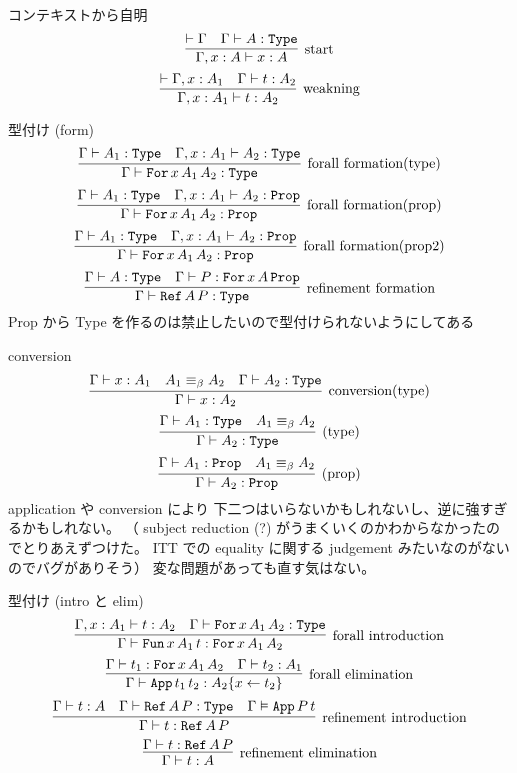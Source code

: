 \begin{itembox}[l]{コンテキストから自明}
  \[\infer[\text{start}]{\Gamma , x : A \vdash x : A}{\vdash \Gamma & \Gamma \vdash A : \texttt{Type}} \]
  \[\infer[\text{weakning}]{\Gamma , x : A_1 \vdash t : A_2}{\vdash \Gamma , x : A_1 & \Gamma \vdash t : A_2} \]
\end{itembox}

\begin{itembox}[l]{型付け (form) }
  \[\infer[\text{forall formation(type)}]{\Gamma \vdash \texttt{For} \, x \, A_1 \, A_2 : \texttt{Type}}{\Gamma \vdash A_1 : \texttt{Type} & \Gamma , x : A_1 \vdash A_2 : \texttt{Type} } \]
  \[\infer[\text{forall formation(prop)}]{\Gamma \vdash \texttt{For} \, x \, A_1 \, A_2 : \texttt{Prop}}{\Gamma \vdash A_1 : \texttt{Type} & \Gamma , x : A_1 \vdash A_2 : \texttt{Prop} } \]
  \[\infer[\text{forall formation(prop2)}]{\Gamma \vdash \texttt{For} \, x \, A_1 \, A_2 : \texttt{Prop}}{\Gamma \vdash A_1 : \texttt{Type} & \Gamma , x : A_1 \vdash A_2 : \texttt{Prop} }\]
  \[\infer[\text{refinement formation}]{\Gamma \vdash \texttt{Ref} \, A \, P : \texttt{Type}}{\Gamma \vdash A : \texttt{Type} & \Gamma \vdash P : \texttt{For} \, x \, A \, \texttt{Prop}} \]
  Prop から Type を作るのは禁止したいので型付けられないようにしてある
\end{itembox}

\begin{itembox}[l]{conversion}
  \[\infer[\text{conversion(type)}]{\Gamma \vdash x : A_2}{\Gamma \vdash x : A_1 & A_1 \equiv_{\beta} A_2 & \Gamma \vdash A_2 : \texttt{Type}} \]
  \[\infer[\text{(type)}]{\Gamma \vdash A_2 : \texttt{Type}}{\Gamma \vdash A_1 : \texttt{Type} & A_1 \equiv_{\beta} A_2} \]
  \[\infer[\text{(prop)}]{\Gamma \vdash A_2 : \texttt{Prop}}{\Gamma \vdash A_1 : \texttt{Prop} & A_1 \equiv_{\beta} A_2} \]
  application や conversion により 下二つはいらないかもしれないし、逆に強すぎるかもしれない。
  （ subject reduction (?) がうまくいくのかわからなかったのでとりあえずつけた。 ITT での equality に関する judgement みたいなのがないのでバグがありそう）
  変な問題があっても直す気はない。
\end{itembox}

\begin{itembox}[l]{型付け (intro と elim) }
  \[\infer[\text{forall introduction}]{\Gamma \vdash \texttt{Fun} \, x \, A_1 \, t : \texttt{For} \, x \, A_1 \, A_2}{\Gamma , x : A_1 \vdash t : A_2 & \Gamma \vdash \texttt{For} \, x \, A_1 \, A_2 : \texttt{Type}} \]
  \[\infer[\text{forall elimination}]{\Gamma \vdash \texttt{App} \, t_1 \, t_2 : A_2\{x \leftarrow t_2\}}{\Gamma \vdash t_1 : \texttt{For} \, x \, A_1 \, A_2 & \Gamma \vdash t_2 : A_1} \]
  \[\infer[\text{refinement introduction}]{\Gamma \vdash t : \texttt{Ref} \, A \, P}{\Gamma \vdash t : A & \Gamma \vdash \texttt{Ref} \, A \, P : \texttt{Type} & \Gamma \vDash \texttt{App} \, P \, t} \]
  \[\infer[\text{refinement elimination}]{\Gamma \vdash t : A}{\Gamma \vdash t : \texttt{Ref} \, A \, P} \]
\end{itembox}


